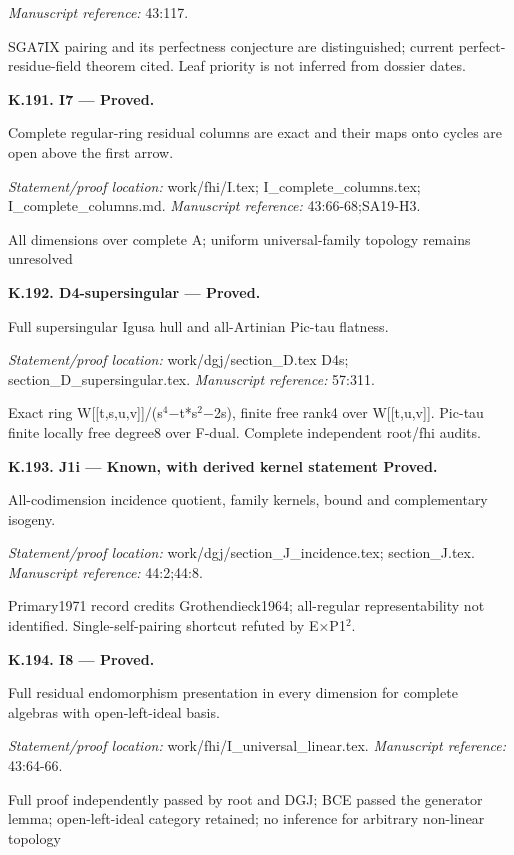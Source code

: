 \emph{Manuscript reference:} 43:117.
\par SGA7IX pairing and its perfectness conjecture are distinguished; current perfect-residue-field theorem cited. Leaf priority is not inferred from dossier dates.
\par\medskip\noindent\textbf{K.191. I7 --- Proved.}\par
Complete regular-ring residual columns are exact and their maps onto cycles are open above the first arrow.
\par\emph{Statement/proof location:} work/fhi/I.tex; I\_complete\_columns.tex; I\_complete\_columns.md.
\emph{Manuscript reference:} 43:66-68;SA19-H3.
\par All dimensions over complete A; uniform universal-family topology remains unresolved
\par\medskip\noindent\textbf{K.192. D4-supersingular --- Proved.}\par
Full supersingular Igusa hull and all-Artinian Pic-tau flatness.
\par\emph{Statement/proof location:} work/dgj/section\_D.tex D4s; section\_D\_supersingular.tex.
\emph{Manuscript reference:} 57:311.
\par Exact ring W[[t,s,u,v]]/(s\ensuremath{{}^4}−t*s\ensuremath{{}^2}−2s), finite free rank4 over W[[t,u,v]]. Pic-tau finite locally free degree8 over F-dual. Complete independent root/fhi audits.
\par\medskip\noindent\textbf{K.193. J1i --- Known, with derived kernel statement Proved.}\par
All-codimension incidence quotient, family kernels, bound and complementary isogeny.
\par\emph{Statement/proof location:} work/dgj/section\_J\_incidence.tex; section\_J.tex.
\emph{Manuscript reference:} 44:2;44:8.
\par Primary1971 record credits Grothendieck1964; all-regular representability not identified. Single-self-pairing shortcut refuted by E×P1\ensuremath{{}^2}.
\par\medskip\noindent\textbf{K.194. I8 --- Proved.}\par
Full residual endomorphism presentation in every dimension for complete algebras with open-left-ideal basis.
\par\emph{Statement/proof location:} work/fhi/I\_universal\_linear.tex.
\emph{Manuscript reference:} 43:64-66.
\par Full proof independently passed by root and DGJ; BCE passed the generator lemma; open-left-ideal category retained; no inference for arbitrary non-linear topology
